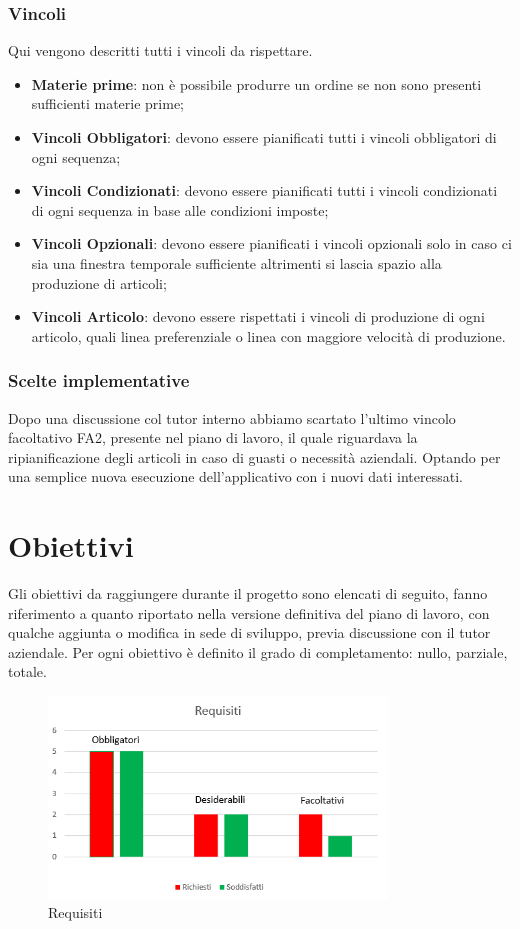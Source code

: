 \subsubsection{Vincoli}
Qui vengono descritti tutti i vincoli da rispettare.
\begin{itemize}
	
	\item \textbf{Materie prime}: non è possibile produrre un ordine se non sono presenti sufficienti materie prime;
	
	\item \textbf{Vincoli Obbligatori}: devono essere pianificati tutti i vincoli obbligatori di ogni sequenza;
	\item \textbf{Vincoli Condizionati}: devono essere pianificati tutti i vincoli condizionati di ogni sequenza in base alle condizioni imposte;
\item \textbf{Vincoli Opzionali}: devono essere pianificati i vincoli opzionali solo in caso ci sia una finestra temporale sufficiente altrimenti si lascia spazio alla produzione di articoli;
	\item \textbf{Vincoli Articolo}: devono essere rispettati i vincoli di produzione di ogni articolo, quali linea preferenziale o linea con maggiore velocità di produzione.
\end{itemize}

\subsubsection{Scelte implementative}
Dopo una discussione col tutor interno abbiamo scartato l'ultimo vincolo facoltativo FA2, presente nel piano di lavoro, il quale riguardava la ripianificazione degli articoli in caso di guasti o necessità aziendali. Optando per una semplice nuova esecuzione dell'applicativo con i nuovi dati interessati. 

\section{Obiettivi}

Gli obiettivi da raggiungere durante il progetto sono elencati di seguito, fanno riferimento a quanto riportato nella versione definitiva del piano di lavoro, con qualche aggiunta o modifica in sede di sviluppo, previa discussione con il tutor aziendale.
Per ogni obiettivo è definito il grado di completamento: nullo, parziale, totale.

\begin{figure}[h]
	\includegraphics[width=9cm]{immagini/requisiti.png}
	\centering
	\caption{Requisiti}
\end{figure}


